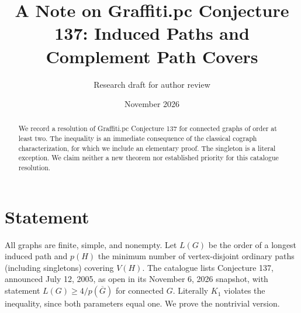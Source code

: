 \documentclass[11pt]{article}
\title{A Note on Graffiti.pc Conjecture 137: Induced Paths and Complement Path Covers}
\author{Research draft for author review}
\date{November 2026}
\begin{document}
\maketitle
\begin{abstract}
We record a resolution of Graffiti.pc Conjecture 137 for connected graphs of order at least two. The inequality is an immediate consequence of the classical cograph characterization, for which we include an elementary proof. The singleton is a literal exception. We claim neither a new theorem nor established priority for this catalogue resolution.
\end{abstract}
\section{Statement}
All graphs are finite, simple, and nonempty. Let $L(G)$ be the order of a longest induced path and $p(H)$ the minimum number of vertex-disjoint ordinary paths (including singletons) covering $V(H)$. The catalogue \cite{wow} lists Conjecture 137, announced July 12, 2005, as open in its November 6, 2026 snapshot, with statement $L(G)\ge 4/p(\overline G)$ for connected $G$. Literally $K_1$ violates the inequality, since both parameters equal one. We prove the nontrivial version.
\end{document}
